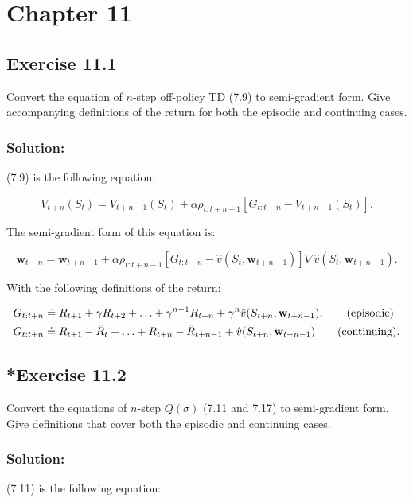 \section*{Chapter 11}

\subsection*{Exercise 11.1}

Convert the equation of $n$-step off-policy TD (7.9) to semi-gradient form.
Give accompanying definitions of the return for both the episodic and continuing cases.

\subsubsection*{Solution:}

(7.9) is the following equation:

\[
    V_{t+n}(S_t) = V_{t+n-1}(S_t) + \alpha \rho_{t:t+n-1} [G_{t:t+n} - V_{t+n-1}(S_t)].
\]

The semi-gradient form of this equation is:

\[
    \mathbf{w}_{t+n} = \mathbf{w}_{t+n-1} + \alpha \rho_{t:t+n-1} \left[G_{t:t+n} - \hat{v}(S_t,\mathbf{w}_{t+n-1}) \right] \nabla \hat{v}(S_t,\mathbf{w}_{t+n-1}).
\]

With the following definitions of the return:

\begin{align*}
    G_{t:t+n} &\doteq R_{t+1} + \gamma R_{t+2} + \ldots + \gamma^{n-1} R_{t+n} + \gamma^n \hat{v}(S_{t+n},\mathbf{w}_{t+n-1}), \text{\qquad (episodic)}\\
    G_{t:t+n} &\doteq R_{t+1} - \bar{R}_{t} + \ldots +  R_{t+n} - \bar{R}_{t+n-1}  +  \hat{v}(S_{t+n},\mathbf{w}_{t+n-1}) \text{\qquad (continuing).}
\end{align*}


\subsection*{*Exercise 11.2}

Convert the equations of $n$-step $Q(\sigma)$ (7.11 and 7.17) to semi-gradient
form. Give definitions that cover both the episodic and continuing cases. 

\subsubsection*{Solution:}
(7.11) is the following equation:

